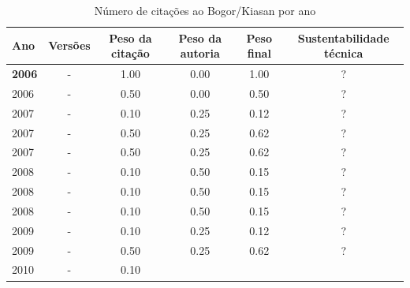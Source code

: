 \begin{table}[H]
\caption{Número de citações ao Bogor/Kiasan por ano}
\centering
\begin{tabular}{| l | c | c | c | c | c |}
  \hline
  Ano & Versões & Peso da citação & Peso da autoria & Peso final & Sustentabilidade técnica \\
  \hline
            {\bf 2006}
          &
          -
          &
          1.00
          &
          0.00
          &
            {\color{blue} 1.00}
          &
          ?
          \\
            2006
          &
          -
          &
          0.50
          &
          0.00
          &
            {\color{blue} 0.50}
          &
          ?
          \\
\hline
            2007
          &
          -
          &
          0.10
          &
          0.25
          &
            {\color{red} 0.12}
          &
          ?
          \\
            2007
          &
          -
          &
          0.50
          &
          0.25
          &
            {\color{blue} 0.62}
          &
          ?
          \\
            2007
          &
          -
          &
          0.50
          &
          0.25
          &
            {\color{blue} 0.62}
          &
          ?
          \\
\hline
            2008
          &
          -
          &
          0.10
          &
          0.50
          &
            {\color{red} 0.15}
          &
          ?
          \\
            2008
          &
          -
          &
          0.10
          &
          0.50
          &
            {\color{red} 0.15}
          &
          ?
          \\
            2008
          &
          -
          &
          0.10
          &
          0.50
          &
            {\color{red} 0.15}
          &
          ?
          \\
\hline
            2009
          &
          -
          &
          0.10
          &
          0.25
          &
            {\color{red} 0.12}
          &
          ?
          \\
            2009
          &
          -
          &
          0.50
          &
          0.25
          &
            {\color{blue} 0.62}
          &
          ?
          \\
\hline
            2010
          &
          -
          &
          0.10

\end{tabular}
\end{table}
